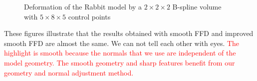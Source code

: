 \documentclass[3p]{elsarticle}
\begin{document}
\begin{figure}[htbp]
\begin{center}
	\begin{minipage}[c]{0.99\textwidth}
		\centering
		\caption{Deformation of the Rabbit model by a $2\times2\times2$ B-spline volume with $5\times8\times5$ control points}
		\label{fig:rabbit}
	\end{minipage}
\end{center}
\end{figure}

These figures illustrate that the results obtained with smooth FFD and improved smooth FFD are almost the same. We can not tell each other with eyes.
\textcolor{red}{The highlight is smooth because the normals that we use are independent of the model geometry. The smooth geometry and sharp features benefit from our geometry and normal adjustment method.}
\end{document}
